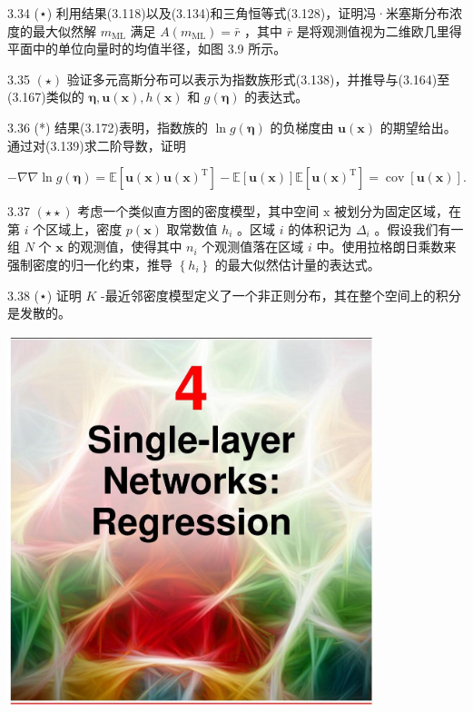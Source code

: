 \documentclass[10pt]{report}
\begin{document}
3.34 (⋆) 利用结果(3.118)以及(3.134)和三角恒等式(3.128)，证明冯·米塞斯分布浓度的最大似然解 \({m}_{\mathrm{{ML}}}\) 满足 \(A\left( {m}_{\mathrm{{ML}}}\right)  = \bar{r}\) ，其中 \(\bar{r}\) 是将观测值视为二维欧几里得平面中的单位向量时的均值半径，如图 3.9 所示。

3.35 \(\left( \star \right)\) 验证多元高斯分布可以表示为指数族形式(3.138)，并推导与(3.164)至(3.167)类似的 \(\mathbf{\eta },\mathbf{u}\left( \mathbf{x}\right) ,h\left( \mathbf{x}\right)\) 和 \(g\left( \mathbf{\eta }\right)\) 的表达式。

3.36 (*) 结果(3.172)表明，指数族的 \(\ln g\left( \mathbf{\eta }\right)\) 的负梯度由 \(\mathbf{u}\left( \mathbf{x}\right)\) 的期望给出。通过对(3.139)求二阶导数，证明

\[
- \nabla \nabla \ln g\left( \mathbf{\eta }\right)  = \mathbb{E}\left\lbrack  {\mathbf{u}\left( \mathbf{x}\right) \mathbf{u}{\left( \mathbf{x}\right) }^{\mathrm{T}}}\right\rbrack   - \mathbb{E}\left\lbrack  {\mathbf{u}\left( \mathbf{x}\right) }\right\rbrack  \mathbb{E}\left\lbrack  {\mathbf{u}{\left( \mathbf{x}\right) }^{\mathrm{T}}}\right\rbrack   = \operatorname{cov}\left\lbrack  {\mathbf{u}\left( \mathbf{x}\right) }\right\rbrack  . \tag{3.218}
\]

3.37 \(\left( {\star  \star  }\right)\) 考虑一个类似直方图的密度模型，其中空间 \(\mathrm{x}\) 被划分为固定区域，在第 \(i\) 个区域上，密度 \(p\left( \mathbf{x}\right)\) 取常数值 \({h}_{i}\) 。区域 \(i\) 的体积记为 \({\Delta }_{i}\) 。假设我们有一组 \(N\) 个 \(\mathbf{x}\) 的观测值，使得其中 \({n}_{i}\) 个观测值落在区域 \(i\) 中。使用拉格朗日乘数来强制密度的归一化约束，推导 \(\left\{  {h}_{i}\right\}\) 的最大似然估计量的表达式。

3.38 (⋆) 证明 \(K\) -最近邻密度模型定义了一个非正则分布，其在整个空间上的积分是发散的。

\begin{center}
\includegraphics[max width=0.8\textwidth]{images/0194e279-9b28-703a-88f4-c3ac21e2010d_130_472_349_1077_1088_0.jpg}
\end{center}
\hspace*{3em} 
\end{document}
